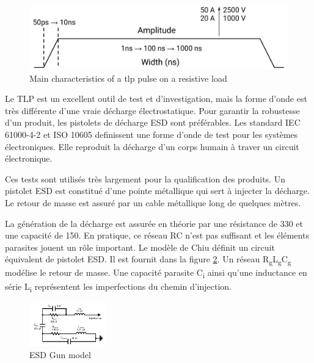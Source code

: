 \begin{figure}[!h]
  \centering
  \includegraphics[width=\textwidth]{src/1/figures/tlp_pulse.pdf}
  \caption{Main characteristics of a \gls{tlp} pulse on a resistive load}
  \label{tlp_pulse}
\end{figure}

Le TLP est un excellent outil de test et d'investigation, mais la forme d'onde est très différente d'une vraie décharge électrostatique.
Pour garantir la robustesse d'un produit, les pistolets de décharge ESD sont préférables.
Les standard IEC 61000-4-2 \cite{iec61000-4-2} et ISO 10605 \cite{iso10605} definissent une forme d'onde de test pour les systèmes électroniques.
Elle reproduit la décharge d'un corps humain à traver un circuit électronique.

Ces tests sont utilisés très largement pour la qualification des produits.
Un pistolet ESD est constitué d'une pointe métallique qui sert à injecter la décharge.
Le retour de masse est assuré par un cable métallique long de quelques mètres.

La génération de la décharge est assurée en théorie par une résistance de 330\textOmega{} et une capacité de 150.
En pratique, ce réseau RC n'est pas suffisant et les éléments parasites jouent un rôle important.
Le modèle de Chiu \cite{phd-chiu} définit un circuit équivalent de pistolet ESD.
Il est fournit dans la figure \ref{fig:esd-gun-model}.
Un réseau R\textsubscript{g}L\textsubscript{g}C\textsubscript{g} modélise le retour de masse.
Une capacité parasite C\textsubscript{i} ainsi qu'une inductance en série L\textsubscript{i} représentent les imperfections du chemin d'injection.

\begin{figure}[!h]
  \centering
  \includegraphics[width=0.3\textwidth]{src/1/figures/gun_model.pdf}
  \caption{ESD Gun model}
  \label{fig:esd-gun-model}
\end{figure}

